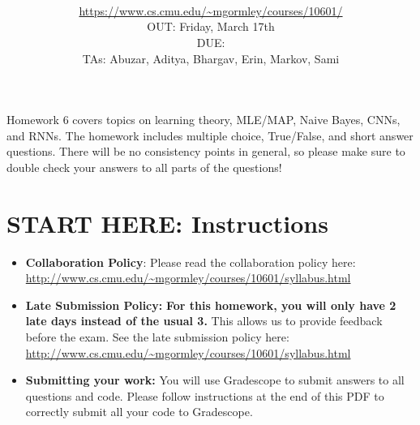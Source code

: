 \documentclass[11pt,addpoints,answers]{exam}
\title{\textsc{\hwName}
} %
\author{\courseName\\
\url{https://www.cs.cmu.edu/~mgormley/courses/10601/} \\
OUT: Friday, March 17th \\
DUE: \dueDate{} \\ 
TAs: Abuzar, Aditya, Bhargav, Erin, Markov, Sami
}
\date{}
\date{}
\begin{document}
\maketitle 

\begin{notebox}
Homework 6 covers topics on learning theory, MLE/MAP, Naive Bayes, CNNs, and RNNs. The homework includes multiple choice, True/False, and short answer questions. There will be no consistency points in general, so please make sure to double check your answers to all parts of the questions!
\end{notebox}
\newcommand \maxsubs {10 }
\section*{START HERE: Instructions}
\begin{itemize}

\item \textbf{Collaboration Policy}: Please read the collaboration policy here: \url{http://www.cs.cmu.edu/~mgormley/courses/10601/syllabus.html}

\item\textbf{Late Submission Policy:} \textbf{For this homework, you will only have 2 late days instead of the usual 3.} This allows us to provide feedback before the exam. See the late submission policy here: \url{http://www.cs.cmu.edu/~mgormley/courses/10601/syllabus.html}

\item\textbf{Submitting your work:} You will use Gradescope to submit
  answers to all questions and code. Please
  follow instructions at the end of this PDF to correctly submit all your code to Gradescope.

  \begin{itemize}
    

    

\end{itemize}
\end{itemize}
\end{document}

